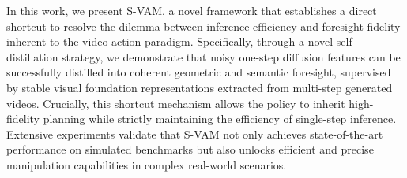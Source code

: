 

\label{sec:conclusion}

In this work, we present S-VAM, a novel framework that establishes a direct shortcut to resolve the dilemma between inference efficiency and foresight fidelity inherent to the video-action paradigm. Specifically, through a novel self-distillation strategy, we demonstrate that noisy one-step diffusion features can be successfully distilled into coherent geometric and semantic foresight, supervised by stable visual foundation representations extracted from multi-step generated videos. Crucially, this shortcut mechanism allows the policy to inherit high-fidelity planning while strictly maintaining the efficiency of single-step inference. Extensive experiments validate that S-VAM not only achieves state-of-the-art performance on simulated benchmarks but also unlocks efficient and precise manipulation capabilities in complex real-world scenarios.



\clearpage 



